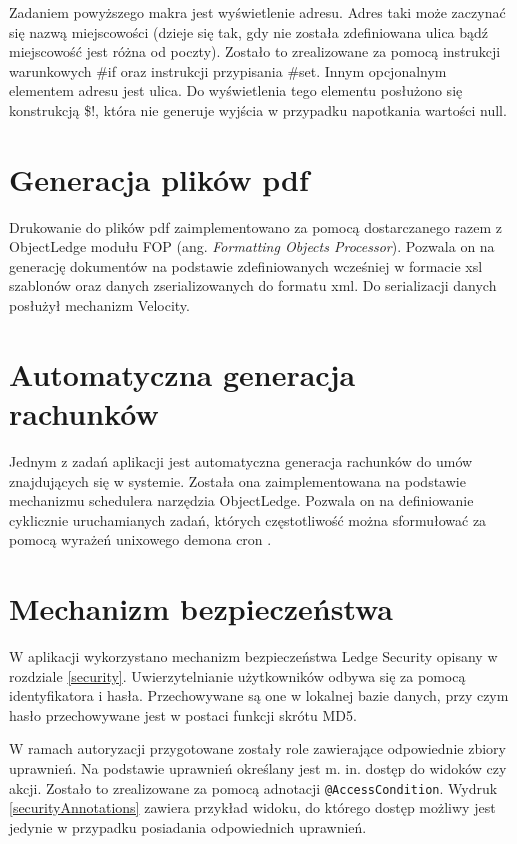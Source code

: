 Zadaniem powyższego makra jest wyświetlenie adresu. Adres taki może zaczynać się nazwą miejscowości (dzieje się tak, gdy nie została zdefiniowana ulica bądź miejscowość jest różna od poczty). Zostało to zrealizowane za pomocą instrukcji warunkowych \#if oraz instrukcji przypisania \#set. Innym opcjonalnym elementem adresu jest ulica. Do wyświetlenia tego elementu posłużono się konstrukcją \$!, która nie generuje wyjścia w przypadku napotkania wartości null.

\section[Generacja plików pdf][Generacja plików pdf]{Generacja plików pdf}
Drukowanie do plików pdf zaimplementowano za pomocą dostarczanego razem z ObjectLedge modułu FOP (ang. \textit{Formatting Objects Processor}). Pozwala on na generację dokumentów na podstawie zdefiniowanych wcześniej w formacie xsl szablonów oraz danych zserializowanych do formatu xml. Do serializacji danych posłużył mechanizm Velocity.

\section[Automatyczna generacja rachunków][Automatyczna generacja rachunków]{Automatyczna generacja rachunków}
Jednym z zadań aplikacji jest automatyczna generacja rachunków do umów znajdujących się w systemie. Została ona zaimplementowana na podstawie mechanizmu schedulera narzędzia ObjectLedge. Pozwala on na definiowanie cyklicznie uruchamianych zadań, których częstotliwość można sformułować za pomocą wyrażeń unixowego demona cron \cite{cron}. 

\section[Mechanizm bezpieczeństwa][Mechanizm bezpieczeństwa]{Mechanizm bezpieczeństwa}
W aplikacji wykorzystano mechanizm bezpieczeństwa Ledge Security opisany w rozdziale \ref{security}. Uwierzytelnianie użytkowników odbywa się za pomocą identyfikatora i hasła. Przechowywane są one w lokalnej bazie danych, przy czym hasło przechowywane jest w postaci funkcji skrótu MD5. 

W ramach autoryzacji przygotowane zostały role zawierające odpowiednie zbiory uprawnień. Na podstawie uprawnień określany jest m. in. dostęp do widoków czy akcji. Zostało to zrealizowane za pomocą adnotacji \texttt{@AccessCondition}. Wydruk \ref{securityAnnotations} zawiera przykład widoku, do którego dostęp możliwy jest jedynie w przypadku posiadania odpowiednich uprawnień.

